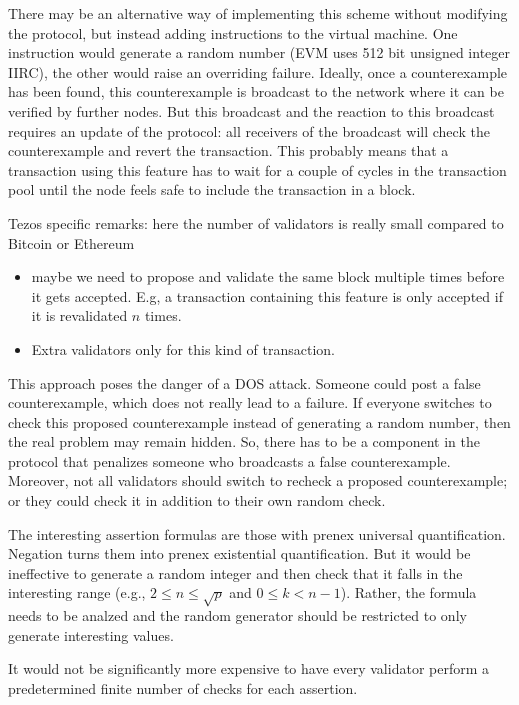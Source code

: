 \documentclass{article}
\newenvironment{changethis}{%
  \begin{tcolorbox}[breakable,notitle,boxrule=0pt,colback=blue!20,colframe=blue!20]}{%
  \end{tcolorbox}}
\begin{document}
There may be an alternative way of implementing this scheme without modifying the
protocol, but instead adding instructions to the virtual machine. One instruction would
generate a random number (EVM uses 512 bit unsigned integer IIRC), the other would
raise an overriding failure. Ideally, once a counterexample has been found, this
counterexample is broadcast to the network where it can be verified by further nodes.
But this broadcast and the reaction to this broadcast requires an update of the
protocol: all receivers of the broadcast will check the counterexample and revert the
transaction. This probably means that a transaction using this feature has to wait for
a couple of cycles in the transaction pool until the node feels safe to include the
transaction in a block.

\begin{changethis}
  Tezos specific remarks: here the number of validators is really small compared to
  Bitcoin or Ethereum
  \begin{itemize}
  \item maybe we need to propose and validate the same block multiple times before it
    gets accepted. E.g, a transaction containing this feature is only accepted if it is
    revalidated $n$ times.
  \item Extra validators only for this kind of transaction.
  \end{itemize}
\end{changethis}
This approach poses the danger of a DOS attack. Someone could post a false
counterexample, which does not really lead to a failure. If everyone switches to check
this proposed counterexample instead of generating a random number, then the real
problem may remain hidden. So, there has to be a component in the protocol that
penalizes someone who broadcasts a false counterexample. Moreover, not all validators
should switch to recheck a proposed counterexample; or they could check it in addition
to their own random check.

The interesting assertion formulas are those with prenex universal
quantification. Negation turns them into prenex existential quantification. But it
would be ineffective to generate a random integer and then check that it falls in the
interesting range (e.g., $2\le n \le \sqrt p$ and $0\le k< n-1$). Rather, the formula
needs to be analzed and the random generator should be restricted to only generate
interesting values. 

It would not be significantly more expensive to have every validator perform a
predetermined finite number of checks for each assertion.
\end{document}
